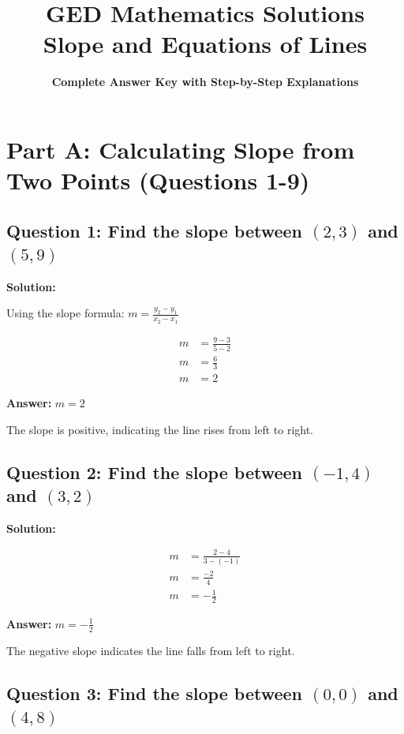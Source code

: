\documentclass[12pt]{article}
\title{\textbf{GED Mathematics Solutions} \\ \textbf{Slope and Equations of Lines}}
\author{\textbf{Complete Answer Key with Step-by-Step Explanations}}
\date{}
\begin{document}
\maketitle

\tableofcontents

\newpage

\section{Part A: Calculating Slope from Two Points (Questions 1-9)}

\subsection*{Question 1: Find the slope between $(2, 3)$ and $(5, 9)$}

\noindent\textbf{Solution:}

Using the slope formula: $m = \frac{y_2 - y_1}{x_2 - x_1}$

\begin{align*}
m &= \frac{9 - 3}{5 - 2} \\
m &= \frac{6}{3} \\
m &= 2
\end{align*}

\textbf{Answer: } $m = 2$

The slope is positive, indicating the line rises from left to right.

\vspace{0.3cm}

\subsection*{Question 2: Find the slope between $(-1, 4)$ and $(3, 2)$}

\noindent\textbf{Solution:}

\begin{align*}
m &= \frac{2 - 4}{3 - (-1)} \\
m &= \frac{-2}{4} \\
m &= -\frac{1}{2}
\end{align*}

\textbf{Answer: } $m = -\frac{1}{2}$

The negative slope indicates the line falls from left to right.

\vspace{0.3cm}

\subsection*{Question 3: Find the slope between $(0, 0)$ and $(4, 8)$}
\end{document}
